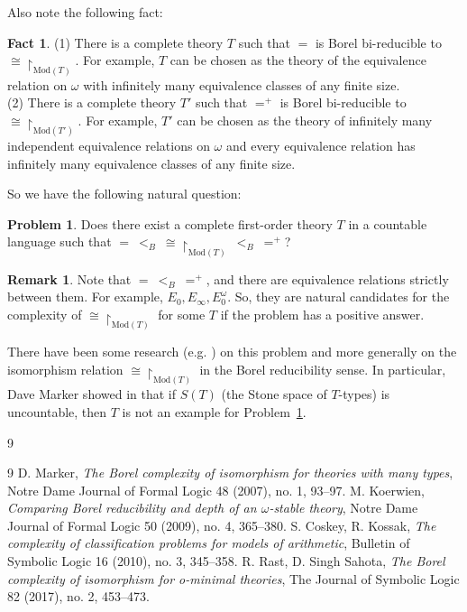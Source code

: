 \documentclass[11pt]{amsart}
\theoremstyle{definition}
\newtheorem{problem}{Problem}[section]
\newtheorem{remark}[theorem]{Remark}
\newtheorem{fact}[theorem]{Fact}
\begin{document}
Also note the following fact:
\begin{fact}
    (1) There is a complete theory $T$ such that $=$ is Borel bi-reducible to $\cong\restriction_{\mathrm{Mod}(T)}$. For example, $T$ can be chosen as the theory of the equivalence relation on $\omega$ with infinitely many equivalence classes of any finite size.\\
   (2) There is a complete theory $T'$ such that $=^+$ is Borel bi-reducible to $\cong\restriction_{\mathrm{Mod}(T')}$. For example, $T'$ can be chosen as the theory of infinitely many independent equivalence relations on $\omega$ and every equivalence relation has infinitely many equivalence classes of any finite size.
\end{fact}
So we have the following natural question:
\begin{problem}\label{prob:12.2}
    Does there exist a complete first-order theory $T$ in a countable language such that $=\ <_B\ \cong\restriction_{\mathrm{Mod}(T)}\ <_B\ =^+$?
\end{problem}

\begin{remark}
    Note that $=\ <_B\ =^+$, and there are equivalence relations strictly between them. For example, $E_0,E_\infty,E^\omega_0$. So, they are natural candidates for the complexity of $\cong\restriction_{\mathrm{Mod}(T)}$ for some $T$ if the problem has a positive answer.
\end{remark}

There have been some research (e.g. \cite{Mar07, Koe09, CK10, RS17}) on this problem and more generally on the isomorphism relation $\cong\restriction_{\mathrm{Mod}(T)}$ in the Borel reducibility sense. In particular, Dave Marker showed in \cite{Mar07} that if $S(T)$ (the Stone space of $T$-types) is uncountable, then $T$ is not an example for Problem~\ref{prob:12.2}.


\vskip -12pt 
\begin{bibentry}{9}
\begin{thebibliography}{9}
 D. Marker, \textit{The Borel complexity of isomorphism for theories with many types}, Notre Dame Journal of Formal Logic 48 (2007), no. 1, 93--97.
 M. Koerwien, \textit{Comparing Borel reducibility and depth of an $\omega$-stable theory}, Notre Dame Journal of Formal Logic 50 (2009), no. 4, 365--380.
 S. Coskey, R. Kossak, \textit{The complexity of classification problems for models of arithmetic}, Bulletin of Symbolic Logic 16 (2010), no. 3, 345--358.
 R. Rast, D. Singh Sahota, \textit{The Borel complexity of isomorphism for o-minimal theories}, The Journal of Symbolic Logic 82 (2017), no. 2, 453--473.
\end{thebibliography}
\end{bibentry}
\end{document}
